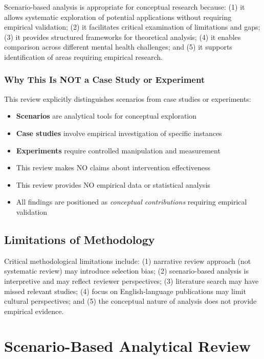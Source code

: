 \documentclass[12pt,a4paper,twocolumn]{article}
\begin{document}
Scenario-based analysis is appropriate for conceptual research because: (1) it allows systematic exploration of potential applications without requiring empirical validation; (2) it facilitates critical examination of limitations and gaps; (3) it provides structured frameworks for theoretical analysis; (4) it enables comparison across different mental health challenges; and (5) it supports identification of areas requiring empirical research.

\subsubsection{Why This Is NOT a Case Study or Experiment}

This review explicitly distinguishes scenarios from case studies or experiments:

\begin{itemize}
    \item \textbf{Scenarios} are analytical tools for conceptual exploration
    \item \textbf{Case studies} involve empirical investigation of specific instances
    \item \textbf{Experiments} require controlled manipulation and measurement
    \item This review makes NO claims about intervention effectiveness
    \item This review provides NO empirical data or statistical analysis
    \item All findings are positioned as \textit{conceptual contributions} requiring empirical validation
\end{itemize}

\subsection{Limitations of Methodology}

Critical methodological limitations include: (1) narrative review approach (not systematic review) may introduce selection bias; (2) scenario-based analysis is interpretive and may reflect reviewer perspectives; (3) literature search may have missed relevant studies; (4) focus on English-language publications may limit cultural perspectives; and (5) the conceptual nature of analysis does not provide empirical evidence.

\section{Scenario-Based Analytical Review}
\end{document}
